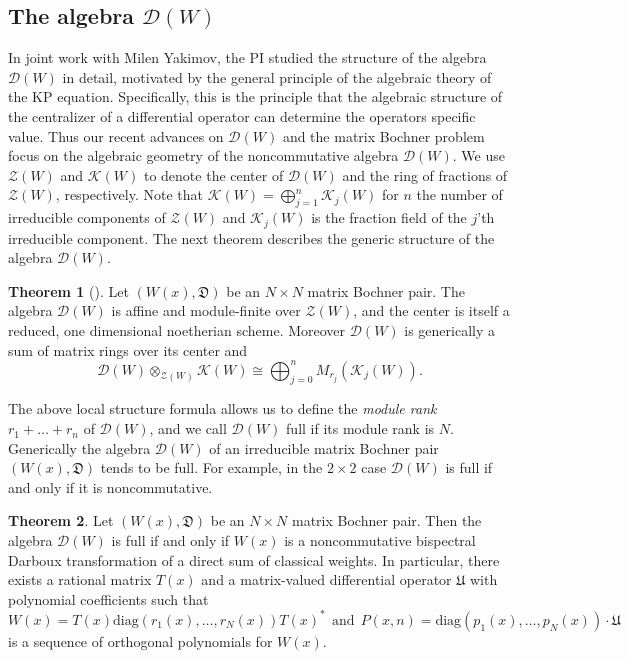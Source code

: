 \documentclass[11pt,letterpaper]{article}
\theoremstyle{definition}
\newtheorem{thm}{Theorem}
\newcommand{\vocab}[1]{\emph{#1}}
\begin{document}
\subsection{The algebra $\mathcal D(W)$}
In joint work with Milen Yakimov, the PI studied the structure of the algebra $\mathcal D(W)$ in detail, motivated by the general principle of the algebraic theory of the KP equation.
Specifically, this is the principle that the algebraic structure of the centralizer of a differential operator can determine the operators specific value.
Thus our recent advances on $\mathcal D(W)$ and the matrix Bochner problem focus on the algebraic geometry of the noncommutative algebra $\mathcal D(W)$.
We use $\mathcal Z(W)$ and $\mathcal K(W)$ to denote the center of $\mathcal D(W)$ and the ring of fractions of $\mathcal Z(W)$, respectively.
Note that $\mathcal K(W) = \bigoplus_{j=1}^n\mathcal K_j(W)$ for $n$ the number of irreducible components of $\mathcal Z(W)$ and $\mathcal K_j(W)$ is the fraction field of the $j$'th irreducible component.
The next theorem describes the generic structure of the algebra $\mathcal D(W)$.
\begin{thm}[\cite{CY2018}]
Let $(W(x),\mathfrak D)$ be an $N\times N$ matrix Bochner pair.
The algebra $\mathcal D(W)$ is affine and module-finite over $\mathcal Z(W)$, and the center is itself a reduced, one dimensional noetherian scheme.
Moreover $\mathcal D(W)$ is generically a sum of matrix rings over its center and
$$\mathcal D(W)\otimes_{\mathcal Z(W)}\mathcal K(W) \cong \bigoplus_{j=0}^n M_{r_j}(\mathcal K_j(W)).$$
\end{thm}
The above local structure formula allows us to define the \vocab{module rank} $r_1+\dots+r_n$ of $\mathcal D(W)$, and we call $\mathcal D(W)$ full if its module rank is $N$.
Generically the algebra $\mathcal D(W)$ of an irreducible matrix Bochner pair $(W(x),\mathfrak D)$ tends to be full.
For example, in the $2\times 2$ case $\mathcal D(W)$ is full if and only if it is noncommutative.
\begin{thm}\cite{CY2018}
Let $(W(x),\mathfrak D)$ be an $N\times N$ matrix Bochner pair.
Then the algebra $\mathcal D(W)$ is full if and only if $W(x)$ is a noncommutative bispectral Darboux transformation of a direct sum of classical weights.
In particular, there exists a rational matrix $T(x)$ and a matrix-valued differential operator $\mathfrak U$ with polynomial coefficients such that
$$W(x) = T(x)\text{diag}(r_1(x),\dots, r_N(x))T(x)^*\ \ \text{and}\ \ P(x,n) = \text{diag}(p_1(x),\dots,p_N(x))\cdot\mathfrak U$$
is a sequence of orthogonal polynomials for $W(x)$.
\end{thm}
\end{document}
